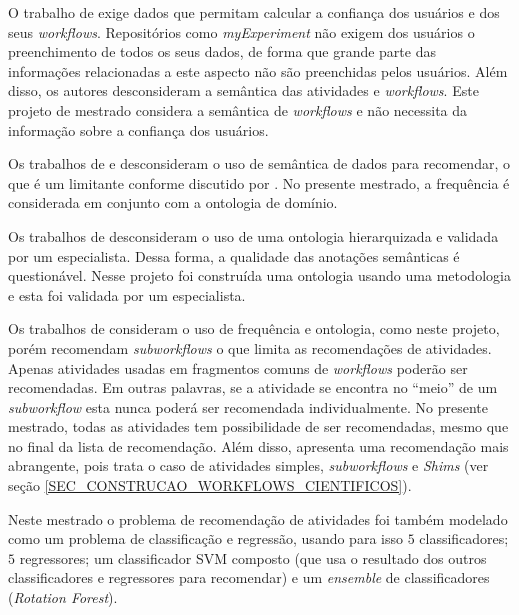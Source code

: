 O trabalho de  exige dados que permitam calcular a confiança dos usuários e dos seus \emph{workflows}. Repositórios como \emph{myExperiment} \cite{ROURE2015} não exigem dos usuários o preenchimento de todos os seus dados, de forma que grande parte das informações relacionadas a este aspecto não são preenchidas pelos usuários. Além disso, os autores desconsideram a semântica das atividades e \emph{workflows}. Este projeto de mestrado considera a semântica de \emph{workflows} e não necessita da informação sobre a confiança dos usuários.

Os trabalhos de  e  desconsideram o uso de semântica de dados para recomendar, o que é um limitante conforme discutido por . No presente mestrado, a frequência é considerada em conjunto com a ontologia de domínio.

Os trabalhos de  desconsideram o uso de uma ontologia hierarquizada e validada por um especialista. Dessa forma, a qualidade das anotações semânticas é questionável. Nesse projeto foi construída uma ontologia usando uma metodologia e esta foi validada por um especialista.

Os trabalhos de  consideram o uso de frequência e ontologia, como neste projeto, porém recomendam \emph{subworkflows} o que limita as recomendações de atividades. Apenas atividades usadas em fragmentos comuns de \emph{workflows} poderão ser recomendadas. Em outras palavras, se a atividade se encontra no ``meio'' de um \emph{subworkflow} esta nunca poderá ser recomendada individualmente. No presente mestrado, todas as atividades tem possibilidade de ser recomendadas, mesmo que no final da lista de recomendação. Além disso, apresenta uma recomendação mais abrangente, pois trata o caso de atividades simples, \emph{subworkflows} e \emph{Shims} (ver seção \ref{SEC_CONSTRUCAO_WORKFLOWS_CIENTIFICOS}).

Neste mestrado o problema de recomendação de atividades foi também modelado como um problema de classificação e regressão, usando para isso \(5\) classificadores; \(5\) regressores; um classificador SVM composto (que usa o resultado dos outros classificadores e regressores para recomendar) e um \emph{ensemble} de classificadores (\emph{Rotation Forest}).

